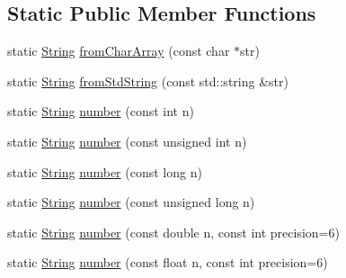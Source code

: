 \subsection*{Static Public Member Functions}
\begin{DoxyCompactItemize}
\item 
static \hyperlink{classprism_1_1_string}{String} \hyperlink{classprism_1_1_string_a11d319bfb0bf70ffdf71d2fc65b963db}{from\+Char\+Array} (const char $\ast$str)
\item 
static \hyperlink{classprism_1_1_string}{String} \hyperlink{classprism_1_1_string_a8692b9a7e4c25f349bb83b53ff3d6f36}{from\+Std\+String} (const std\+::string \&str)
\item 
static \hyperlink{classprism_1_1_string}{String} \hyperlink{classprism_1_1_string_a634481b6536dde9995b44082fbcbe0c5}{number} (const int n)
\item 
static \hyperlink{classprism_1_1_string}{String} \hyperlink{classprism_1_1_string_a4c8e81538cb37882488ff35b03b00f19}{number} (const unsigned int n)
\item 
static \hyperlink{classprism_1_1_string}{String} \hyperlink{classprism_1_1_string_a3eae3ed3829125b583ae9050849b5d4d}{number} (const long n)
\item 
static \hyperlink{classprism_1_1_string}{String} \hyperlink{classprism_1_1_string_a0da92ce265e3b9dee756746634a2ed1c}{number} (const unsigned long n)
\item 
static \hyperlink{classprism_1_1_string}{String} \hyperlink{classprism_1_1_string_a8662487577697139f34b0a98f339a35d}{number} (const double n, const int precision=6)
\item 
static \hyperlink{classprism_1_1_string}{String} \hyperlink{classprism_1_1_string_a31d878bd52b7576b00152b9e832c78b8}{number} (const float n, const int precision=6)
\end{DoxyCompactItemize}
